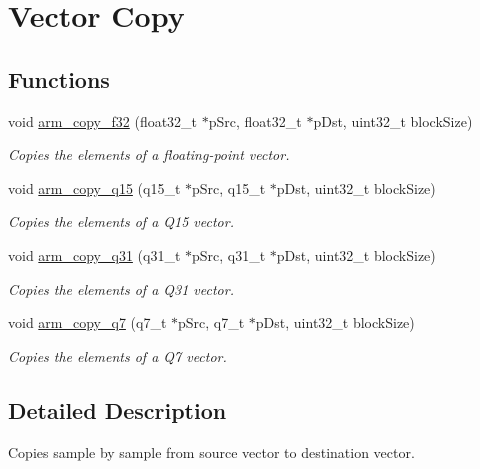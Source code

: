 \hypertarget{group__copy}{}\section{Vector Copy}
\label{group__copy}
\subsection*{Functions}
\begin{DoxyCompactItemize}
\item 
void \hyperlink{group__copy_gadd1f737e677e0e6ca31767c7001417b3}{arm\+\_\+copy\+\_\+f32} (float32\+\_\+t $\ast$p\+Src, float32\+\_\+t $\ast$p\+Dst, uint32\+\_\+t block\+Size)
\begin{DoxyCompactList}\small\item\em Copies the elements of a floating-\/point vector. \end{DoxyCompactList}\item 
void \hyperlink{group__copy_ga872ca4cfc18c680b8991ccd569a5fda0}{arm\+\_\+copy\+\_\+q15} (q15\+\_\+t $\ast$p\+Src, q15\+\_\+t $\ast$p\+Dst, uint32\+\_\+t block\+Size)
\begin{DoxyCompactList}\small\item\em Copies the elements of a Q15 vector. \end{DoxyCompactList}\item 
void \hyperlink{group__copy_gaddf70be7e3f87e535c324862b501f3f9}{arm\+\_\+copy\+\_\+q31} (q31\+\_\+t $\ast$p\+Src, q31\+\_\+t $\ast$p\+Dst, uint32\+\_\+t block\+Size)
\begin{DoxyCompactList}\small\item\em Copies the elements of a Q31 vector. \end{DoxyCompactList}\item 
void \hyperlink{group__copy_ga467579beda492aa92797529d794c88fb}{arm\+\_\+copy\+\_\+q7} (q7\+\_\+t $\ast$p\+Src, q7\+\_\+t $\ast$p\+Dst, uint32\+\_\+t block\+Size)
\begin{DoxyCompactList}\small\item\em Copies the elements of a Q7 vector. \end{DoxyCompactList}\end{DoxyCompactItemize}


\subsection{Detailed Description}
Copies sample by sample from source vector to destination vector.


